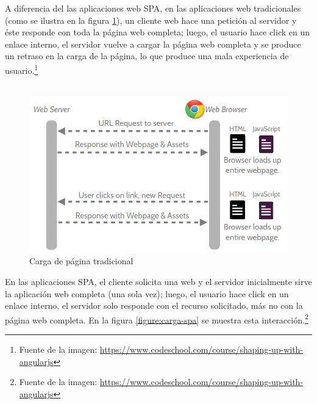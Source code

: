 			A diferencia del las aplicaciones web SPA, en las aplicaciones
			web tradicionales (como se ilustra en la figura
			\ref{figure:carga-tradicional}), un cliente web hace una petición al servidor
			y éste responde con toda la página web completa; luego, el usuario hace click
			en un enlace interno, el servidor vuelve a cargar la página web completa
			y se produce un retraso en la carga de la página, lo que produce una mala
			experiencia de usuario.\footnote{Fuente de la imagen:
			\href{https://www.codeschool.com/course/shaping-up-with-angularjs}
			{https://www.codeschool.com/course/shaping-up-with-angularjs}} \\\
			
			\begin{figure}[H]
			    \centering
				\includegraphics[width=18cm]{../imgs/ejemplos/1.png}
				\caption{Carga de página tradicional}
				\label{figure:carga-tradicional}
			\end{figure}
			
			\newpage
			
			En las aplicaciones SPA, el cliente solicita una web y el servidor
			inicialmente sirve la aplicación web completa (una sola vez); luego, el
			usuario hace click en un enlace interno, el servidor solo responde con el recurso
			solicitado, más no con la página web completa. En la figura
			\ref{figure:carga-spa} se muestra esta interacción.\footnote{Fuente de la imagen: 
			\href{https://www.codeschool.com/course/shaping-up-with-angularjs}
			{https://www.codeschool.com/course/shaping-up-with-angularjs}}
			
